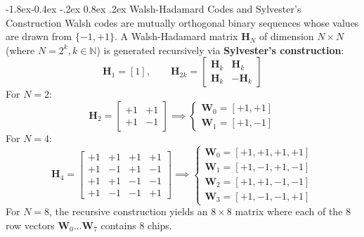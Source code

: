 \documentclass[11pt,a4paper]{article}
\makeatletter
\renewcommand\subsection{\@startsection{subsection}{2}{\z@}%
                                     {-1.8ex\@plus -0.4ex \@minus -.2ex}%
                                     {0.8ex \@plus .2ex}%
                                     {\normalfont\large\bfseries}}
\makeatother
\begin{document}
\subsection{Walsh-Hadamard Codes and Sylvester's Construction}
Walsh codes are mutually orthogonal binary sequences whose values are drawn from $\{-1, +1\}$. A Walsh-Hadamard matrix $\mathbf{H}_N$ of dimension $N \times N$ (where $N = 2^k, k \in \mathbb{N}$) is generated recursively via \textbf{Sylvester's construction}:
\begin{equation}
    \mathbf{H}_1 = [1], \qquad \mathbf{H}_{2k} = \begin{bmatrix} \mathbf{H}_k & \mathbf{H}_k \\ \mathbf{H}_k & -\mathbf{H}_k \end{bmatrix}
\end{equation}
For $N = 2$:
\begin{equation}
    \mathbf{H}_2 = \begin{bmatrix} +1 & +1 \\ +1 & -1 \end{bmatrix} \implies \begin{cases} \mathbf{W}_0 = [+1, +1] \\ \mathbf{W}_1 = [+1, -1] \end{cases}
\end{equation}
For $N = 4$:
\begin{equation}
    \mathbf{H}_4 = \begin{bmatrix} 
        +1 & +1 & +1 & +1 \\ 
        +1 & -1 & +1 & -1 \\ 
        +1 & +1 & -1 & -1 \\ 
        +1 & -1 & -1 & +1 
    \end{bmatrix} \implies \begin{cases} 
        \mathbf{W}_0 = [+1, +1, +1, +1] \\ 
        \mathbf{W}_1 = [+1, -1, +1, -1] \\ 
        \mathbf{W}_2 = [+1, +1, -1, -1] \\ 
        \mathbf{W}_3 = [+1, -1, -1, +1] 
    \end{cases}
\end{equation}
For $N = 8$, the recursive construction yields an $8 \times 8$ matrix where each of the 8 row vectors $\mathbf{W}_0 \dots \mathbf{W}_7$ contains 8 chips.
\end{document}

